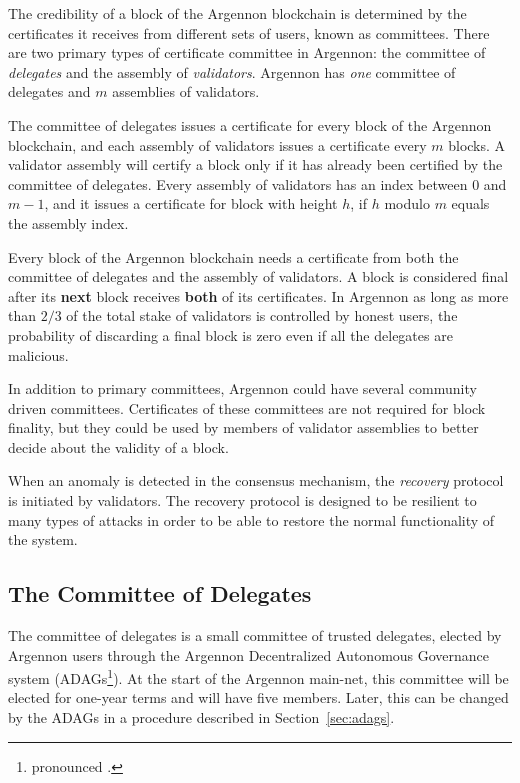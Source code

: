 
The credibility of a block of the Argennon blockchain is determined by the certificates it receives
from different sets of users, known as committees. There are two primary types of certificate committee in
Argennon: the committee of \emph{delegates} and the assembly of \emph{validators}. Argennon has \emph{one} committee
of delegates and $m$ assemblies of validators.

The committee of delegates issues a certificate for every block of the Argennon blockchain, and each
assembly of validators issues a certificate every $m$ blocks. A validator assembly will
certify a block only if it has already been certified by the committee of delegates. Every assembly of validators has
an index between $0$ and $m - 1$, and it issues a certificate for block with height $h$, if $h$ modulo $m$ equals
the assembly index.

Every block of the Argennon blockchain needs a certificate from both the committee of delegates and
the assembly of validators. A block is considered final after its \textbf{next} block receives \textbf{both} of
its certificates. In Argennon as long as more than $2/3$ of the total stake of validators is controlled by honest users,
the probability of discarding a final block is zero even if all the delegates are malicious.

In addition to primary committees, Argennon could have several community driven committees. Certificates of these
committees are not required for block finality, but they could be used by members of validator assemblies to better
decide about the validity of a block.

When an anomaly is detected in the consensus mechanism, the \emph{recovery} protocol is initiated by validators. The
recovery protocol is designed to be resilient to many types of attacks in order to be able to restore the normal
functionality of the system.

\subsection{The Committee of Delegates}\label{subsec:the-committee-of-delegates}

The committee of delegates is a small committee of trusted delegates, elected by Argennon users through the
Argennon Decentralized Autonomous Governance system (ADAGs\footnote{pronounced .}).
At the start of the Argennon main-net, this committee will be elected for one-year terms and will have five members.
Later, this can be changed by the ADAGs in a procedure described in Section~\ref{sec:adags}.

